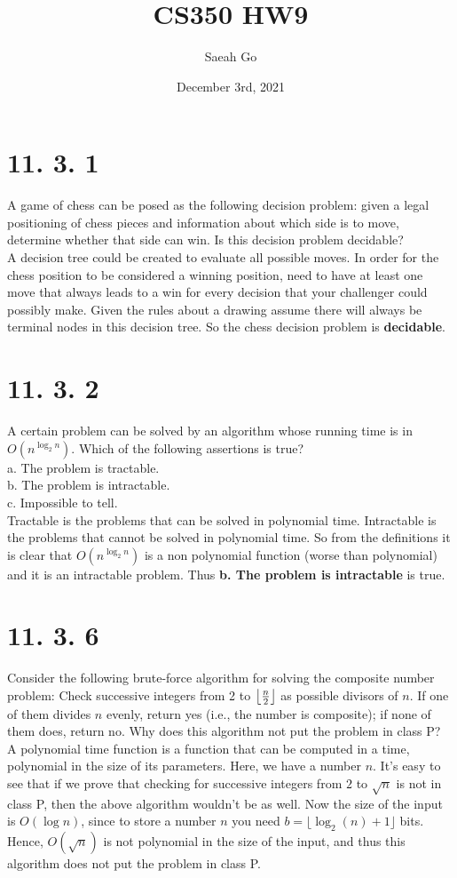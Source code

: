 \documentclass{article}
\title{CS350 HW9}
\author{Saeah Go}
\date{December 3rd, 2021}
\DeclarePairedDelimiter\floor{\lfloor}{\rfloor}
\begin{document}
\maketitle

\section{11. 3. 1}
\indent \indent A game of chess can be posed as the following decision problem: given a legal positioning of chess pieces and information about which side is to move, determine whether that side can win. Is this decision problem decidable? \\
\indent A decision tree could be created to evaluate all possible moves. In order for the chess position to be considered a winning position, need to have at least one move that always leads to a win for every decision that your challenger could possibly make. Given the rules about a drawing assume there will always be terminal nodes in this decision tree. So the chess decision problem is \textbf{decidable}.

\section{11. 3. 2}
\indent \indent A certain problem can be solved by an algorithm whose running time is in $O(n^{\log_2 n})$. Which of the following assertions is true? \\
\indent \indent \indent a. The problem is tractable. \\
\indent \indent \indent b. The problem is intractable. \\
\indent \indent \indent c. Impossible to tell. \\
\indent Tractable is the problems that can be solved in polynomial time. Intractable is the problems that cannot be solved in polynomial time. So from the definitions it is clear that $O(n^{\log_2 n})$ is a non polynomial function (worse than polynomial) and it is an intractable problem. Thus \textbf{b. The problem is intractable} is true.


\section{11. 3. 6}
\indent \indent Consider the following brute-force algorithm for solving the composite number problem: Check successive integers from 2 to $\floor*{\frac{n}{2}}$ as possible divisors of $n$. If one of them divides $n$ evenly, return yes (i.e., the number is composite); if none of them does, return no. Why does this algorithm not put the problem in class P? \\
\indent A polynomial time function is a function that can be computed in a time, polynomial in the size of its parameters. Here, we have a number $n$. 
It's easy to see that if we prove that checking for successive integers from $2$ to $\sqrt{n}$ is not in class P, then the above algorithm wouldn't be as well. 
Now the size of the input is $O(\log n)$, since to store a number $n$ you need $b = \lfloor\log_{2} (n) + 1\rfloor$ bits. Hence, $O(\sqrt{n})$ is not polynomial in the size of the input, and thus this algorithm does not put the problem in class P.
\end{document}
